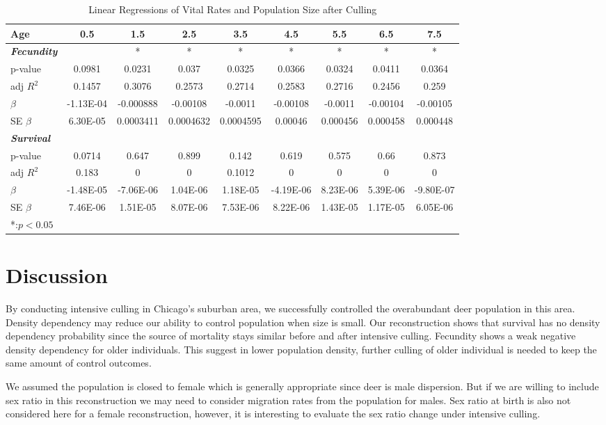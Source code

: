 \documentclass[]{article}
\begin{document}
\begin{table}[htbp] %
	\centering
	\caption{\label{tab:DDvital}Linear Regressions of Vital Rates and Population Size after Culling}
	\centering
	\begin{tabular}{lcccccccc}
		\toprule
		Age  &0.5&1.5&2.5&3.5&4.5&5.5&6.5&7.5\\
		\midrule
		\textbf{\textit{Fecundity}} & & * &* &* &* &* &* &* \\
		p-value & 0.0981&0.0231&0.037&0.0325&0.0366&0.0324&0.0411&0.0364\\
		adj $R^2$&0.1457&0.3076&0.2573&0.2714&0.2583&0.2716&0.2456&0.259\\
		$\beta$ &-1.13E-04&-0.000888&-0.00108&-0.0011&-0.00108&-0.0011&-0.00104&-0.00105\\
		SE $\beta$&6.30E-05&0.0003411&0.0004632&0.0004595&0.00046&0.000456&0.000458	&0.000448\\
		\textbf{\textit{Survival}} & & & & & & & & \\
		p-value&0.0714&0.647&0.899&0.142&0.619&0.575&0.66&0.873\\
		adj $R^2$ &0.183 &0 &0 &0.1012 &0 &0 &0 &0\\
		$\beta$&-1.48E-05&-7.06E-06&1.04E-06&1.18E-05&-4.19E-06&8.23E-06&5.39E-06&-9.80E-07\\
		SE $\beta$ &7.46E-06&1.51E-05&8.07E-06&7.53E-06&8.22E-06&1.43E-05&1.17E-05&6.05E-06\\
		
		\bottomrule
		 *:$p<0.05$&
	\end{tabular}
\end{table}


\section{Discussion}
By conducting intensive culling in Chicago's suburban area, we successfully controlled the overabundant deer population in this area. Density dependency may reduce our ability to control population when size is small. Our reconstruction shows that survival has no density dependency probability since the source of mortality stays similar before and after intensive culling. Fecundity shows a weak negative density dependency for older individuals. This suggest in lower population density, further culling of older individual is needed to keep the same amount of control outcomes. 

We assumed the population is closed to female which is generally appropriate since deer is male dispersion. But if we are willing to include sex ratio in this reconstruction we may need to consider migration rates from the population for males. Sex ratio at birth is also not considered here for a female reconstruction, however, it is interesting to evaluate the sex ratio change under intensive culling.
\end{document}
